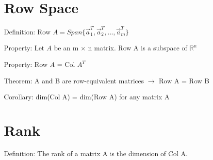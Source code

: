 \documentclass[12pt]{article}
\begin{document}
	\section{Row Space}
	Definition: Row $A = Span\{\vec{a}_1^T, \vec{a}_2^T,\dots,\vec{a}_m^T\}$ \par 
	Property: Let $A$ be an m $\times$ n matrix. Row A is a subspace of $\mathbb{R}^n$ \par 
	Property: Row $A$ = Col $A^T$ \par 
	Theorem: A and B are row-equivalent matrices $\rightarrow$ Row A = Row B \par
	Corollary: dim(Col A) = dim(Row A) for any matrix A \par
	\section{Rank}
	Definition: The rank of a matrix A is the dimension of Col A.
\end{document}

